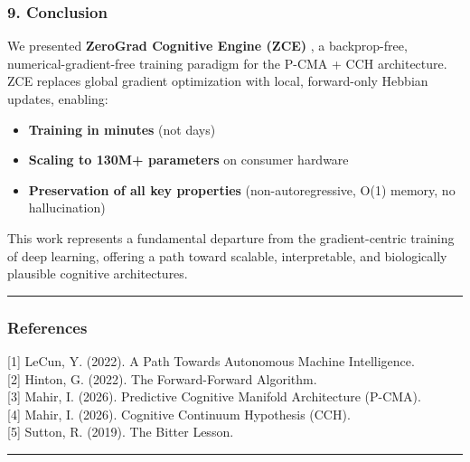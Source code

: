 \documentclass[
  11pt,
  a4paper,
]{article}
\providecommand{\tightlist}{%
  \setlength{\itemsep}{0pt}\setlength{\parskip}{0pt}}
\begin{document}
\subsubsection{9. Conclusion}\label{conclusion-8}

We presented \textbf{ZeroGrad Cognitive Engine (ZCE)} , a backprop-free,
numerical-gradient-free training paradigm for the P-CMA + CCH
architecture. ZCE replaces global gradient optimization with local,
forward-only Hebbian updates, enabling:

\begin{itemize}
\tightlist
\item
  \textbf{Training in minutes} (not days)
\item
  \textbf{Scaling to 130M+ parameters} on consumer hardware
\item
  \textbf{Preservation of all key properties} (non-autoregressive, O(1)
  memory, no hallucination)
\end{itemize}

This work represents a fundamental departure from the gradient-centric
training of deep learning, offering a path toward scalable,
interpretable, and biologically plausible cognitive architectures.

\begin{center}\rule{0.5\linewidth}{0.5pt}\end{center}

\subsubsection{References}\label{references-8}

{[}1{]} LeCun, Y. (2022). A Path Towards Autonomous Machine
Intelligence.\\
{[}2{]} Hinton, G. (2022). The Forward-Forward Algorithm.\\
{[}3{]} Mahir, I. (2026). Predictive Cognitive Manifold Architecture
(P-CMA).\\
{[}4{]} Mahir, I. (2026). Cognitive Continuum Hypothesis (CCH).\\
{[}5{]} Sutton, R. (2019). The Bitter Lesson.

\begin{center}\rule{0.5\linewidth}{0.5pt}\end{center}
\end{document}
